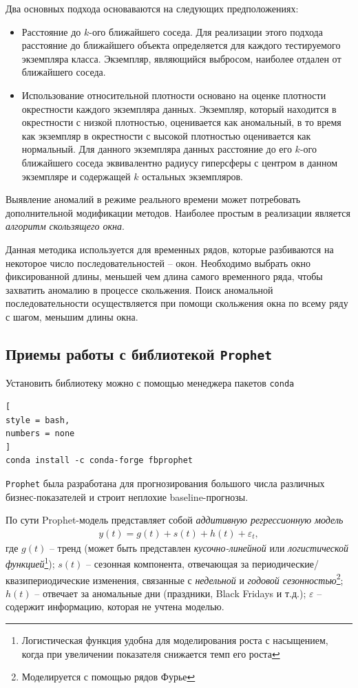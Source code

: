 \documentclass[%
	11pt,
	a4paper,
	utf8,
		]{article}
\begin{document}
Два основных подхода основаваются на следующих предположениях:
\begin{itemize}
	\item Расстояние до $ k $-ого ближайшего соседа. Для реализации этого подхода расстояние до ближайшего объекта определяется для каждого тестируемого экземпляра класса. Экземпляр, являющийся выбросом, наиболее отдален от ближайшего соседа.
	
	\item Использование относительной плотности основано на оценке плотности окрестности каждого экземпляра данных. Экземпляр, который находится в окрестности с низкой плотностью, оценивается как аномальный, в то время как экземпляр в окрестности с высокой плотностью оценивается как нормальный. Для данного экземпляра данных расстояние до его $ k $-ого ближайшего соседа эквивалентно радиусу гиперсферы с центром в данном экземпляре и содержащей $ k $ остальных экземпляров.
\end{itemize}

Выявление аномалий в режиме реального времени может потребовать дополнительной модификации методов. Наиболее простым в реализации является \emph{алгоритм скользящего окна}.

Данная методика используется для временных рядов, которые разбиваются на некоторое число последовательностей -- окон. Необходимо выбрать окно фиксированной длины, меньшей чем длина самого временного ряда, чтобы захватить аномалию в процессе скольжения. Поиск аномальной последовательности осуществляется при помощи скольжения окна по всему ряду с шагом, меньшим длины окна.


\subsection{Приемы работы с библиотекой \texttt{Prophet}}

Установить библиотеку можно с помощью менеджера пакетов \texttt{conda}
\begin{lstlisting}[
style = bash,
numbers = none
]
conda install -c conda-forge fbprophet
\end{lstlisting}

\texttt{Prophet} была разработана для прогнозирования большого числа различных бизнес-показателей и строит неплохие baseline-прогнозы.

По сути Prophet-модель представляет собой \emph{аддитивную регрессионную модель}
\begin{align*}
	y(t) = g(t) + s(t) + h(t) + \varepsilon_t,
\end{align*}
где $ g(t) $ -- тренд (может быть представлен \emph{кусочно-линейной} или \emph{логистической функцией}\footnote{Логистическая функция удобна для моделирования роста с насыщением, когда при увеличении показателя снижается темп его роста}); $ s(t) $ -- сезонная компонента, отвечающая за периодические/квазипериодические изменения, связанные с \emph{недельной} и \emph{годовой сезонностью}\footnote{Моделируется с помощью рядов Фурье}; $ h(t) $ -- отвечает за аномальные дни (праздники, Black Fridays и т.д.); $ \varepsilon $ -- содержит информацию, которая не учтена моделью.
\end{document}
